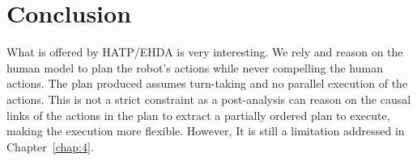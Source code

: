 \section{Conclusion}

What is offered by HATP/EHDA is very interesting. We rely and reason on the human model to plan the robot's actions while never compelling the human actions. The plan produced assumes turn-taking and no parallel execution of the actions. This is not a strict constraint as a post-analysis can reason on the causal links of the actions in the plan to extract a partially ordered plan to execute, making the execution more flexible. However, It is still a limitation addressed in Chapter~\ref{chap:4}.
